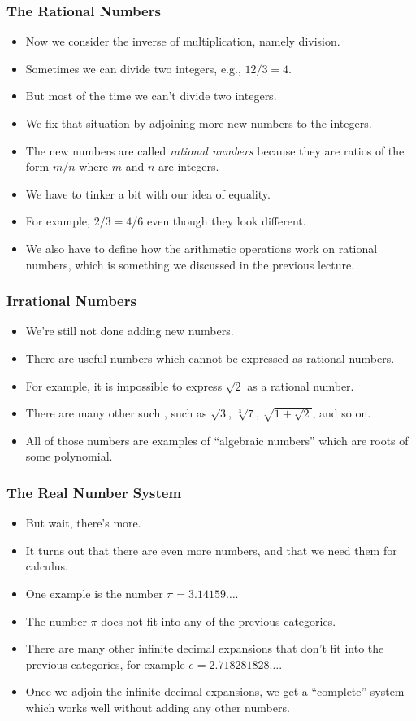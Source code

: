 \documentclass[serif,ignorenonframetext]{beamer}
\begin{document}
\begin{frame}
  \frametitle{The Rational Numbers}
  \begin{itemize}[<+->]
  \item Now we consider the inverse of multiplication, namely division.
  \item Sometimes we can divide two integers, e.g., $12/3=4$.
  \item But most of the time we can't divide two integers.
  \item We fix that situation by adjoining more new numbers to the
    integers.
  \item The new numbers are called \textit{rational numbers} because
    they are ratios of the form $m/n$ where $m$ and $n$ are integers.
  \item We have to tinker a bit with our idea of equality.
  \item For example, $2/3 = 4/6$ even though they look different.
  \item We also have to define how the arithmetic operations work
    on rational numbers, which is something we discussed in the previous
    lecture.
  \end{itemize}
\end{frame}

\begin{frame}
  \frametitle{Irrational Numbers}
  \begin{itemize}[<+->]
  \item We're still not done adding new numbers.  
  \item There are useful numbers which cannot be expressed as rational
    numbers.
  \item For example, it is impossible to express $\sqrt{2}$ as a rational 
    number.
  \item There are many other such , such as
    $\sqrt{3}$, $\sqrt[3]{7}$, $\sqrt{1+\sqrt{2}}$, and so on.
  \item All of those numbers are examples of ``algebraic numbers'' which 
    are roots of some polynomial.
  \end{itemize}
\end{frame}

\begin{frame}
  \frametitle{The Real Number System}
  \begin{itemize}[<+->]
  \item But wait, there's more.
  \item It turns out that there are even more numbers, and that we need
    them for calculus.
  \item One example is the number $\pi = 3.14159\ldots$.
  \item The number $\pi$ does not fit into any of the previous categories.
  \item There are many other infinite decimal expansions that don't fit
    into the previous categories, for example $e = 2.718281828\ldots$.
  \item Once we adjoin the infinite decimal expansions, we get a ``complete''
    system which works well without adding any other numbers.
  \end{itemize}
\end{frame}
\end{document}
